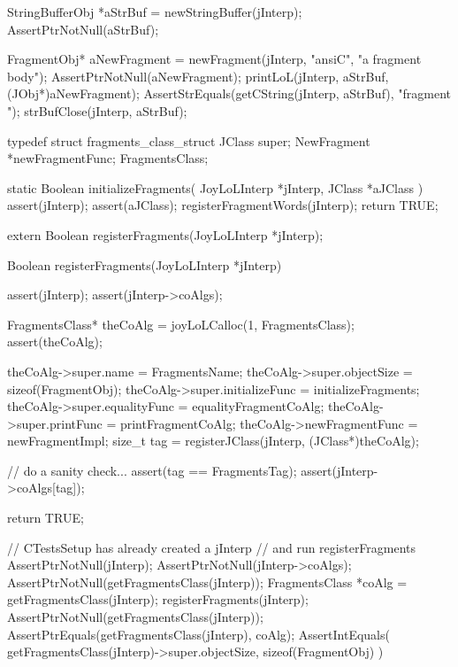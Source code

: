   StringBufferObj *aStrBuf = newStringBuffer(jInterp);
  AssertPtrNotNull(aStrBuf);
  
  FragmentObj* aNewFragment =
    newFragment(jInterp, "ansiC", "a fragment body");
  AssertPtrNotNull(aNewFragment);
  printLoL(jInterp, aStrBuf, (JObj*)aNewFragment);
  AssertStrEquals(getCString(jInterp, aStrBuf), "fragment ");
  strBufClose(jInterp, aStrBuf);
\stopCTest
\stopTestCase
\stopTestSuite

\startTestSuite[registerFragments]

\startCHeader
typedef struct fragments_class_struct {
  JClass       super;
  NewFragment      *newFragmentFunc;
} FragmentsClass;

\stopCHeader

\startCCode
static Boolean initializeFragments(
  JoyLoLInterp *jInterp,
  JClass   *aJClass
) {
  assert(jInterp);
  assert(aJClass);
  registerFragmentWords(jInterp);
  return TRUE;
}
\stopCCode

\startCHeader
extern Boolean registerFragments(JoyLoLInterp *jInterp);
\stopCHeader
{}

\startCCode
Boolean registerFragments(JoyLoLInterp *jInterp) {
  assert(jInterp);
  assert(jInterp->coAlgs);
  
  FragmentsClass* theCoAlg
    = joyLoLCalloc(1, FragmentsClass);
  assert(theCoAlg);
  
  theCoAlg->super.name           = FragmentsName;
  theCoAlg->super.objectSize     = sizeof(FragmentObj);
  theCoAlg->super.initializeFunc = initializeFragments;
  theCoAlg->super.equalityFunc   = equalityFragmentCoAlg;
  theCoAlg->super.printFunc      = printFragmentCoAlg;
  theCoAlg->newFragmentFunc = newFragmentImpl;
  size_t tag =
    registerJClass(jInterp, (JClass*)theCoAlg);
  
  // do a sanity check...
  assert(tag == FragmentsTag);
  assert(jInterp->coAlgs[tag]);
   
  return TRUE;
}
\stopCCode


\startCTest
  // CTestsSetup has already created a jInterp
  // and run registerFragments
  AssertPtrNotNull(jInterp);
  AssertPtrNotNull(jInterp->coAlgs);
  AssertPtrNotNull(getFragmentsClass(jInterp));
  FragmentsClass *coAlg = getFragmentsClass(jInterp);
  registerFragments(jInterp);
  AssertPtrNotNull(getFragmentsClass(jInterp));
  AssertPtrEquals(getFragmentsClass(jInterp), coAlg);
  AssertIntEquals(
    getFragmentsClass(jInterp)->super.objectSize,
    sizeof(FragmentObj)
  )
\stopCTest
\stopTestCase
\stopTestSuite
